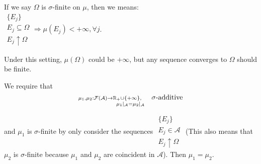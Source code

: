 \begin{define}
  If we say $\Omega$ is $\sigma$-finite on $\mu$, then we means: \\
  $\substack{\{E_j\}\\E_j\subseteq\Omega\\E_j\uparrow \Omega} \Rightarrow \mu(E_j) < +\infty, \forall j$.
\end{define}

\begin{remark}
  Under this setting, $\mu(\Omega)$ could be $+\infty$, but any sequence converges to $\Omega$ should be finite.
\end{remark}

\begin{lemma}[uniqueness]
  We require that
  \[\substack{\mu_1, \mu_2 : \mathcal{F}(\mathcal{A}) \to \mathbb{R}_+\cup\{+\infty\}, \hspace{0.5cm} \mbox{$\sigma$-additive} \\
      \mu_1|_{\mathcal{A}} = \mu_2|_{\mathcal{A}} \\
      \
    }\]
  and $\mu_1$ is $\sigma$-finite by only consider the sequences $\substack{\{E_j\}\\E_j\in\mathcal{A}\\E_j\uparrow\Omega}$ (This also means that $\mu_2$ is $\sigma$-finite because $\mu_1$ and $\mu_2$ are coincident in $\mathcal{A}$).
  Then $\mu_1 = \mu_2$.
\end{lemma}

